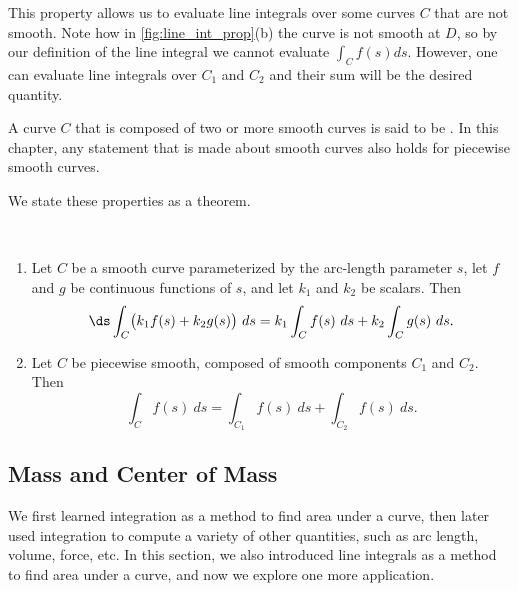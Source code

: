 This property allows us to evaluate line integrals over some curves $C$ that are not smooth. Note how in \autoref{fig:line_int_prop}(b) the curve is not smooth at $D$, so by our definition of the line integral we cannot evaluate $\int_C f(s)ds$. However, one can evaluate line integrals over $C_1$ and $C_2$ and their sum will be the desired quantity.

A curve $C$ that is composed of two or more smooth curves is said to be . In this chapter, any statement that is made about smooth curves also holds for piecewise smooth curves.


We state these properties as a theorem.

\begin{theorem}\label{thm:line_int_properties_scalar}
%
\mbox{}\\[-2\baselineskip]\begin{enumerate}
	\item	Let $C$ be a smooth curve parameterized by the arc-length parameter $s$, let $f$ and $g$ be continuous functions of $s$, and let $k_1$ and $k_2$ be scalars. Then
\[\ds \int_C\bigl(k_1f(s)+k_2g(s)\bigr)\ ds = k_1\int_Cf(s)\ ds +k_2\int_Cg(s)\ ds.\]
	\item Let $C$ be piecewise smooth, composed of smooth components $C_1$ and $C_2$. Then
\[\int_Cf(s)\ ds = \int_{C_1}f(s)\ ds + \int_{C_2}f(s)\ ds.\]
\end{enumerate}
\end{theorem}

\subsection{Mass and Center of Mass}

We first learned integration as a method to find area under a curve, then later used integration to compute a variety of other quantities, such as arc length, volume, force, etc. In this section, we also introduced line integrals as a method to find area under a curve, and now we explore one more application.

